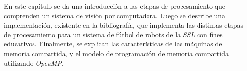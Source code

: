 
En este capítulo se da una introducción a las etapas de procesamiento que
comprenden un sistema de visión por computadora. Luego se describe una
implementación, existente en la bibliografía, que implementa las distintas
etapas de procesamiento para un sistema de fútbol de robots de la \emph{SSL} con
fines educativos. Finalmente, se explican las características de las máquinas de
memoria compartida, y el modelo de programación de memoria compartida utilizando
\emph{OpenMP}.

